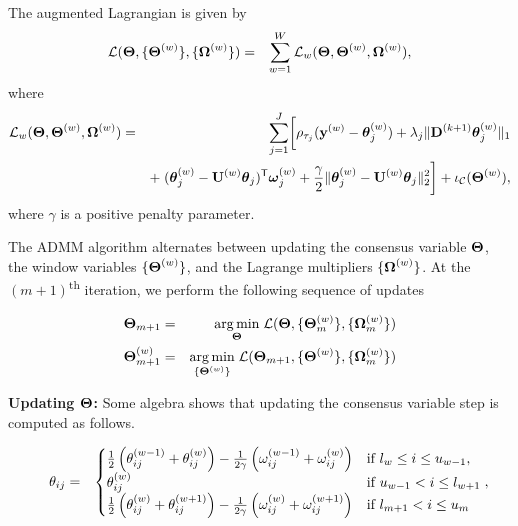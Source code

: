 \documentclass[aoas]{imsart}
\newcommand{\Tra}{^{\sf T}} %
\newcommand{\V}[1]{{\bm{\mathbf{\MakeLowercase{#1}}}}} %
\newcommand{\Vn}[2]{\V{#1}^{(#2)}} %
\newcommand{\M}[1]{{\bm{\mathbf{\MakeUppercase{#1}}}}} %
\newcommand{\ME}[2]{\MakeLowercase{#1}_{#2}} %
\newcommand{\Mn}[2]{\M{#1}^{(#2)}} %
\newcommand{\MnE}[3]{\MakeLowercase{#1}^{(#2)}_{#3}} %
\begin{document}
The augmented Lagrangian is given by
\begin{eqnarray*}
	\mathcal{L}(\M{\Theta}, \{\Mn{\Theta}{w}\}, \{\Mn{\Omega}{w}\}) & = & \sum_{w=1}^W \mathcal{L}_w(\M{\Theta}, \Mn{\Theta}{w}, \Mn{\Omega}{w}),
\end{eqnarray*}
where
\begin{eqnarray*}
	\mathcal{L}_w(\M{\Theta}, \Mn{\Theta}{w}, \Mn{\Omega}{w}) & = & \sum_{j=1}^J \biggl [\rho_{\tau_j}(\Vn{y}{w} - \Vn{\theta}{w}_j)+\lambda_j \lVert \Mn{D}{k+1}\Vn{\theta}{w}_j\rVert_1 \\
	&& + \; (\Vn{\theta}{w}_j - \Mn{U}{w}\V{\theta}_{j})\Tra\Vn{\omega}{w}_{j} +
	\frac{\gamma}{2}\lVert \Vn{\theta}{w}_j - \Mn{U}{w}\V{\theta}_{j}\rVert_2^2 \biggr ] + \iota_\mathcal{C}(\Mn{\Theta}{w}),
\end{eqnarray*}
where $\gamma$ is a positive penalty parameter.

The ADMM algorithm alternates between updating the consensus variable $\M{\Theta}$, the window variables $\{\Mn{\Theta}{w}\}$, and the Lagrange multipliers $\{\Mn{\Omega}{w}\}$.
At the $(m+1)$\textsuperscript{th} iteration, we perform the following sequence of updates

\begin{eqnarray*}
	\M{\Theta}_{m+1} & = & \underset{\M{\Theta}}{\arg\min}\; \mathcal{L}(\M{\Theta}, \{\Mn{\Theta}{w}_m\}, \{\Mn{\Omega}{w}_m\}) \\
	\Mn{\Theta}{w}_{m+1} & = & \underset{\{\Mn{\Theta}{w}\}}{\arg\min}\; \mathcal{L}(\M{\Theta}_{m+1}, \{\Mn{\Theta}{w}\}, \{\Mn{\Omega}{w}_m\}) \\
\end{eqnarray*}

{\bf Updating $\M{\Theta}$: } Some algebra shows that updating the consensus variable step is computed as follows.

\begin{eqnarray}
\label{eq:update_consensus}
~~~~\ME{\theta}{ij}	 &=& \begin{cases}
\frac{1}{2}\left (\MnE{\theta}{w-1}{ij} + \MnE{\theta}{w}{ij} \right)
-
\frac{1}{2\gamma} \left (\MnE{\omega}{w-1}{ij} + \MnE{\omega}{w}{ij} \right)
& \mbox{if~} l_{w} \le i \le u_{w-1},  \\
\MnE{\theta}{w}{ij} & \mbox{if~} u_{w-1} < i \le l_{w+1}  \\
\frac{1}{2} \left ( \MnE{\theta}{w}{ij} + \MnE{\theta}{w+1}{ij} \right )
-
\frac{1}{2\gamma}	\left (\MnE{\omega}{w}{ij} + \MnE{\omega}{w+1}{ij} \right )
& \mbox{if~} l_{m+1} < i \le u_{m}
\end{cases},
\end{eqnarray}
\end{document}

